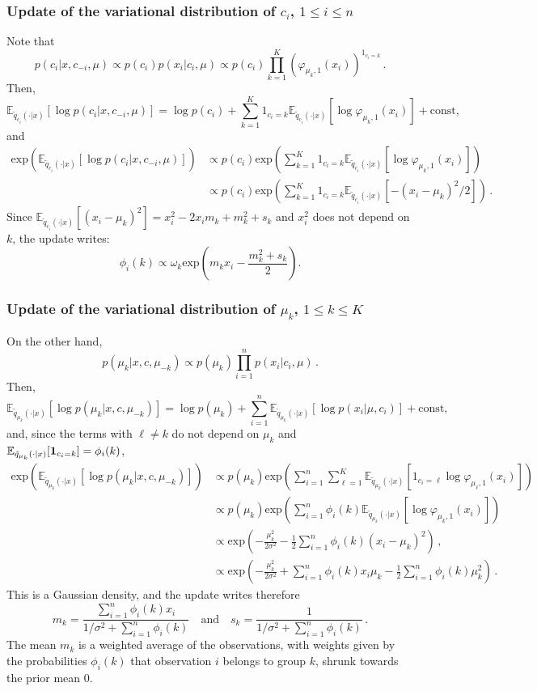 \documentclass[english,graybox,envcountchap,envcountsame,sectrefs,shortlabels]{svmono}
\theoremstyle{style}
\newcommand{\eqsp}{}
\begin{document}
\subsubsection*{Update of the variational distribution of $c_i$, $1\leq i \leq n$}
Note that
$$
p(c_i|x,c_{-i},\mu) \propto p(c_i)p(x_i|c_i,\mu) \propto p(c_i)\prod_{k=1}^K \left(\varphi_{\mu_k,1}(x_i)\right)^{1_{c_i=k}}\,. 
$$
Then,
$$
\mathbb{E}_{\tilde q_{c_i}(\cdot|x)}[\log p(c_i|x,c_{-i},\mu)] = \log p(c_i) + \sum_{k=1}^K 1_{c_i=k} \mathbb{E}_{\tilde q_{c_i}(\cdot|x)}[\log \varphi_{\mu_k,1}(x_i)] + \mathrm{const}\eqsp,
$$
and
\begin{align*}
\mathrm{exp}\left(\mathbb{E}_{\tilde q_{c_i}(\cdot|x)}[\log p(c_i|x,c_{-i},\mu)]\right) &\propto p(c_i) \mathrm{exp}\left(\sum_{k=1}^K 1_{c_i=k} \mathbb{E}_{\tilde q_{c_i}(\cdot|x)}[\log \varphi_{\mu_k,1}(x_i)]\right)\,\\
&\propto p(c_i) \mathrm{exp}\left(\sum_{k=1}^K 1_{c_i=k} \mathbb{E}_{\tilde q_{c_i}(\cdot|x)}[-(x_i-\mu_k)^2/2]\right)\,.
\end{align*}
Since $\mathbb{E}_{\tilde q_{c_i}(\cdot|x)}[(x_i-\mu_k)^2] = x_i^2 - 2x_im_k + m_k^2+s_k$ and $x_i^2$ does not depend on $k$, the update writes:
$$
\phi_i(k) \propto \omega_k\mathrm{exp}\left(m_k x_i - \frac{m^2_k + s_k}{2}\right)\eqsp.
$$

\subsubsection*{Update of the variational distribution of $\mu_k$, $1\leq k \leq K$}
On the other hand,
$$
p(\mu_k|x,c,\mu_{-k}) \propto p(\mu_k)\prod_{i=1}^np(x_i|c_i,\mu) \,. 
$$
Then,
$$
\mathbb{E}_{\tilde q_{\mu_k}(\cdot|x)}[\log p(\mu_k|x,c,\mu_{-k})] = \log p(\mu_k) + \sum_{i=1}^n \mathbb{E}_{\tilde q_{\mu_k}(\cdot|x)}[\log p(x_i|\mu,c_i)] + \mathrm{const}\eqsp,
$$
and, since the terms with $\ell\neq k$ do not depend on $\mu_k$ and $\mathbb{E}_{\tilde q_{\mu_k}(\cdot|x)}[\mathbf{1}_{c_i=k}] = \phi_i(k)$,
\begin{align*}
\mathrm{exp}\left(\mathbb{E}_{\tilde q_{\mu_k}(\cdot|x)}[\log p(\mu_k|x,c,\mu_{-k})]\right) &\propto p(\mu_k) \mathrm{exp}\left(\sum_{i=1}^n\sum_{\ell=1}^K  \mathbb{E}_{\tilde q_{\mu_k}(\cdot|x)}[1_{c_i=\ell}\log \varphi_{\mu_\ell,1}(x_i)]\right)\,\\
&\propto p(\mu_k) \mathrm{exp}\left(\sum_{i=1}^n \phi_i(k) \mathbb{E}_{\tilde q_{\mu_k}(\cdot|x)}[\log \varphi_{\mu_k,1}(x_i)]\right)\,\\
&\propto \mathrm{exp}\left(-\frac{\mu_k^2}{2\sigma^2}-\frac{1}{2}\sum_{i=1}^n \phi_i(k)(x_i-\mu_k)^2\right)\,,\\
&\propto \mathrm{exp}\left(-\frac{\mu_k^2}{2\sigma^2}+\sum_{i=1}^n \phi_i(k)x_i\mu_k - \frac{1}{2}\sum_{i=1}^n \phi_i(k)\mu^2_k\right)\,.
\end{align*}
This is a Gaussian density, and the update writes therefore
$$
m_k = \frac{\sum_{i=1}^n \phi_i(k)x_i}{1/\sigma^2 + \sum_{i=1}^n \phi_i(k)}\quad\mathrm{and}\quad s_k = \frac{1}{1/\sigma^2 + \sum_{i=1}^n \phi_i(k)}\,. 
$$
The mean $m_k$ is a weighted average of the observations, with weights given by the probabilities $\phi_i(k)$ that observation $i$ belongs to group $k$, shrunk towards the prior mean $0$.
\end{document}
